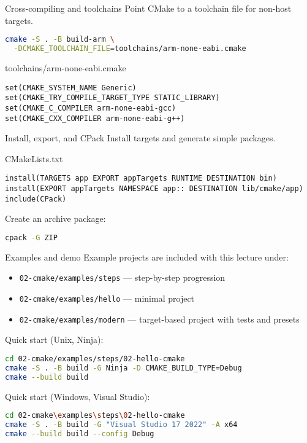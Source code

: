 \documentclass{beamer}
\begin{document}
\begin{frame}[fragile]{Cross-compiling and toolchains}
  Point CMake to a toolchain file for non-host targets.
  \begin{lstlisting}[language=bash]
cmake -S . -B build-arm \
  -DCMAKE_TOOLCHAIN_FILE=toolchains/arm-none-eabi.cmake
  \end{lstlisting}
  \begin{block}{toolchains/arm-none-eabi.cmake}
    \begin{lstlisting}
set(CMAKE_SYSTEM_NAME Generic)
set(CMAKE_TRY_COMPILE_TARGET_TYPE STATIC_LIBRARY)
set(CMAKE_C_COMPILER arm-none-eabi-gcc)
set(CMAKE_CXX_COMPILER arm-none-eabi-g++)
    \end{lstlisting}
  \end{block}
\end{frame}

\begin{frame}[fragile]{Install, export, and CPack}
  Install targets and generate simple packages.
  \begin{block}{CMakeLists.txt}
    \begin{lstlisting}
install(TARGETS app EXPORT appTargets RUNTIME DESTINATION bin)
install(EXPORT appTargets NAMESPACE app:: DESTINATION lib/cmake/app)
include(CPack)
    \end{lstlisting}
  \end{block}
  Create an archive package:
  \begin{lstlisting}[language=bash]
cpack -G ZIP
  \end{lstlisting}
\end{frame}

\begin{frame}[fragile]{Examples and demo}
  Example projects are included with this lecture under:
  \begin{itemize}
    \item \texttt{02-cmake/examples/steps} — step-by-step progression
    \item \texttt{02-cmake/examples/hello} — minimal project
    \item \texttt{02-cmake/examples/modern} — target-based project with tests and presets
  \end{itemize}
  Quick start (Unix, Ninja):
  \begin{lstlisting}[language=bash]
cd 02-cmake/examples/steps/02-hello-cmake
cmake -S . -B build -G Ninja -D CMAKE_BUILD_TYPE=Debug
cmake --build build
  \end{lstlisting}
  Quick start (Windows, Visual Studio):
  \begin{lstlisting}[language=bash]
cd 02-cmake\examples\steps\02-hello-cmake
cmake -S . -B build -G "Visual Studio 17 2022" -A x64
cmake --build build --config Debug
  \end{lstlisting}
\end{frame}
\end{document}
